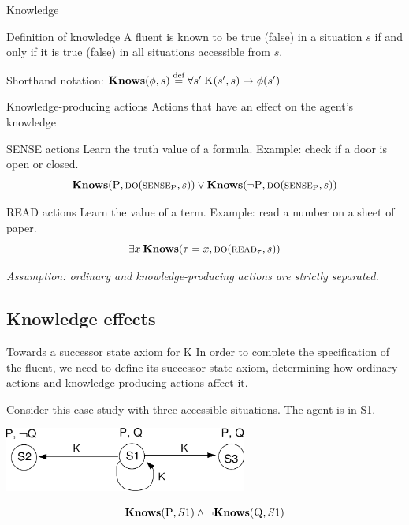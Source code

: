 \begin{frame}{Knowledge}
    \begin{block}{Definition of knowledge}
        A fluent is known to be true (false) in a situation \(s\)
        if and only if it is true (false)
        in all situations accessible from \(s\).
    \end{block}

    Shorthand notation: \( \textbf{Knows}(\phi, s) \stackrel{\text{def}}{=} \forall s' \: \textsc{K}(s',s) \rightarrow \phi(s') \)
\end{frame}

\begin{frame}{Knowledge-producing actions}
    Actions that have an effect on the agent's knowledge

    \begin{block}{SENSE actions}
        Learn the truth value of a formula. Example: check if a door is open or closed.
        \[
            \textbf{Knows}(\textsc{P}, \textsc{do}(\textsc{sense}_\text{P}, s))
            \lor
            \textbf{Knows}(\lnot \textsc{P}, \textsc{do}(\textsc{sense}_\text{P}, s))
        \]
    \end{block}

    \begin{block}{READ actions}
        Learn the value of a term. Example: read a number on a sheet of paper.
        \[
            \exists x \: \textbf{Knows}(\tau = x, \textsc{do}(\textsc{read}_\tau, s))
        \]
    \end{block}

    \emph{Assumption: ordinary and knowledge-producing actions are strictly separated.}
\end{frame}

\subsection{Knowledge effects}

\begin{frame}{Towards a successor state axiom for K}
    In order to complete the specification of the  fluent,
    we need to define its successor state axiom,
    determining how ordinary actions and knowledge-producing actions affect it.

    Consider this case study with three accessible situations. The agent is in S1.

    \begin{center}
        \includegraphics[width=0.6\textwidth]{assets/3states_noactions.png}
    \end{center}

    \[ \textbf{Knows}(\textsc{P}, S1) \land \lnot \textbf{Knows}(\textsc{Q}, S1) \]
\end{frame}

